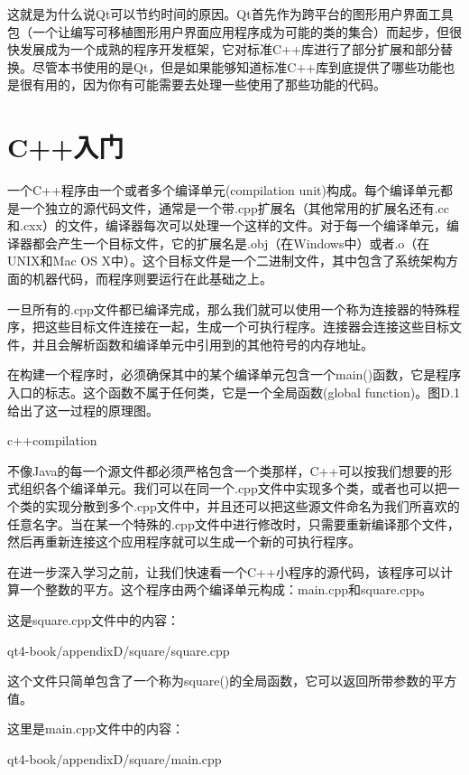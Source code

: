 \documentclass[11pt,oneside]{book}
\begin{document}
\begin{common-format}
这就是为什么说Qt可以节约时间的原因。Qt首先作为跨平台的图形用户界面工具包（一个让编写可移植图形用户界面应用程序成为可能的类的集合）而起步，但很快发展成为一个成熟的程序开发框架，它对标准C++库进行了部分扩展和部分替换。尽管本书使用的是Qt，但是如果能够知道标准C++库到底提供了哪些功能也是很有用的，因为你有可能需要去处理一些使用了那些功能的代码。

\section{C++入门}
一个C++程序由一个或者多个编译单元(compilation unit)构成。每个编译单元都是一个独立的源代码文件，通常是一个带.cpp扩展名（其他常用的扩展名还有.cc和.cxx）的文件，编译器每次可以处理一个这样的文件。对于每一个编译单元，编译器都会产生一个目标文件，它的扩展名是.obj（在Windows中）或者.o（在UNIX和Mac OS X中）。这个目标文件是一个二进制文件，其中包含了系统架构方面的机器代码，而程序则要运行在此基础之上。  

一旦所有的.cpp文件都已编译完成，那么我们就可以使用一个称为连接器的特殊程序，把这些目标文件连接在一起，生成一个可执行程序。连接器会连接这些目标文件，并且会解析函数和编译单元中引用到的其他符号的内存地址。

在构建一个程序时，必须确保其中的某个编译单元包含一个main()函数，它是程序入口的标志。这个函数不属于任何类，它是一个全局函数(global function)。图D.1给出了这一过程的原理图。
\begin{fig}[0.8]{c++compilation}
\caption{C++的编译过程（在Windows中）}
\label{fig:c++compilation}
\end{fig}

不像Java的每一个源文件都必须严格包含一个类那样，C++可以按我们想要的形式组织各个编译单元。我们可以在同一个.cpp文件中实现多个类，或者也可以把一个类的实现分散到多个.cpp文件中，并且还可以把这些源文件命名为我们所喜欢的任意名字。当在某一个特殊的.cpp文件中进行修改时，只需要重新编译那个文件，然后再重新连接这个应用程序就可以生成一个新的可执行程序。

在进一步深入学习之前，让我们快速看一个C++小程序的源代码，该程序可以计算一个整数的平方。这个程序由两个编译单元构成：main.cpp和square.cpp。

这是square.cpp文件中的内容：
\begin{cppinput}{qt4-book/appendixD/square/square.cpp}
\end{cppinput}

这个文件只简单包含了一个称为square()的全局函数，它可以返回所带参数的平方值。

这里是main.cpp文件中的内容：
\begin{cppinput}{qt4-book/appendixD/square/main.cpp}
\end{cppinput}


\end{common-format}
\end{document}
